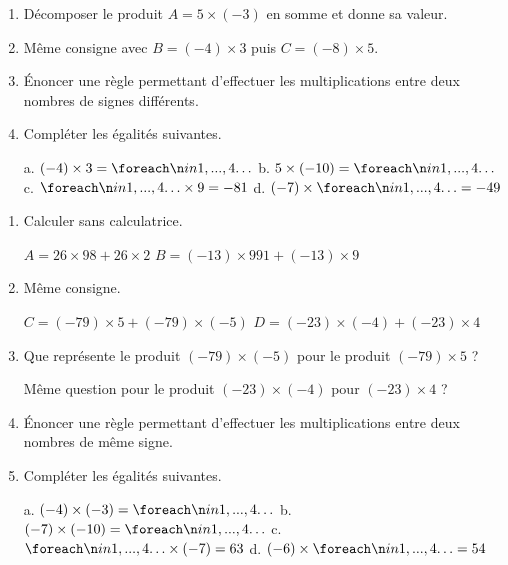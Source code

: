 \documentclass[a4paper]{book}
\begin{document}
\vspace{1cm}


\setcounter{exo}{1}

    \begin{exercice}
        \begin{enumerate}
            \item Décomposer le produit $A=5\times(-3)$ en somme et donne sa valeur.

            \item Même consigne avec $B=(-4)\times3$ puis $C=(-8)\times5$.

            \item Énoncer une règle permettant d'effectuer les multiplications entre deux nombres de signes différents.
            
            \item Compléter les égalités suivantes.

            a. $(-4)\times3=\points[4]$ \quad b. $5\times(-10)=\points[4]$ \quad 
            c. $\points[4]\times9=-81$ \quad  d. $(-7)\times\points[4]=-49$ 
        \end{enumerate}
    \end{exercice}


    \begin{exercice}
        \begin{enumerate}
            \item Calculer sans calculatrice.

            $A=26\times98+26\times2$ \quad $B=(-13)\times991+(-13)\times9$

            \item Même consigne.

            $C=(-79)\times5+(-79)\times(-5)$  \quad $D=(-23)\times(-4)+(-23)\times4$

            \item Que représente le produit $(-79)\times(-5)$ pour le produit $(-79)\times5$ ?

            Même question pour le produit $(-23)\times(-4)$ pour $(-23)\times4$ ?

            \item Énoncer une règle permettant d'effectuer les multiplications entre deux nombres de même signe.

            \item Compléter les égalités suivantes.

            a. $(-4)\times(-3)=\points[4]$ \quad b. $(-7)\times(-10)=\points[4]$ \quad 
            c. $\points[4]\times(-7)=63$ \quad  d. $(-6)\times\points[4]=54$ 
        \end{enumerate}
    \end{exercice}
\end{document}
